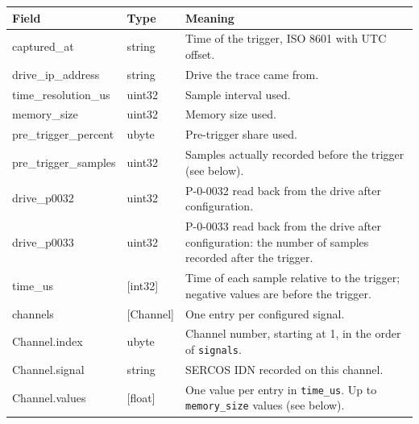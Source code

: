 \documentclass[11pt,a4paper]{article}
\newcommand{\dl}[1]{\texttt{#1}}
\begin{document}
\begin{center}
\small
\begin{tabularx}{\textwidth}{@{}>{\ttfamily}l l X@{}}
\toprule
\normalfont Field & Type & Meaning \\
\midrule
captured\_at          & string   & Time of the trigger, ISO 8601 with UTC offset. \\
drive\_ip\_address    & string   & Drive the trace came from. \\
time\_resolution\_us  & uint32   & Sample interval used. \\
memory\_size          & uint32   & Memory size used. \\
pre\_trigger\_percent & ubyte    & Pre-trigger share used. \\
pre\_trigger\_samples & uint32   & Samples actually recorded before the trigger (see below). \\
drive\_p0032          & uint32   & P-0-0032 read back from the drive after configuration. \\
drive\_p0033          & uint32   & P-0-0033 read back from the drive after configuration: the number of samples recorded after the trigger. \\
time\_us              & [int32]  & Time of each sample relative to the trigger; negative values are before the trigger. \\
channels              & [Channel] & One entry per configured signal. \\
\midrule
Channel.index         & ubyte    & Channel number, starting at 1, in the order of \dl{signals}. \\
Channel.signal        & string   & SERCOS IDN recorded on this channel. \\
Channel.values        & [float]  & One value per entry in \dl{time\_us}. Up to \dl{memory\_size} values (see below). \\
\bottomrule
\end{tabularx}
\end{center}
\end{document}
